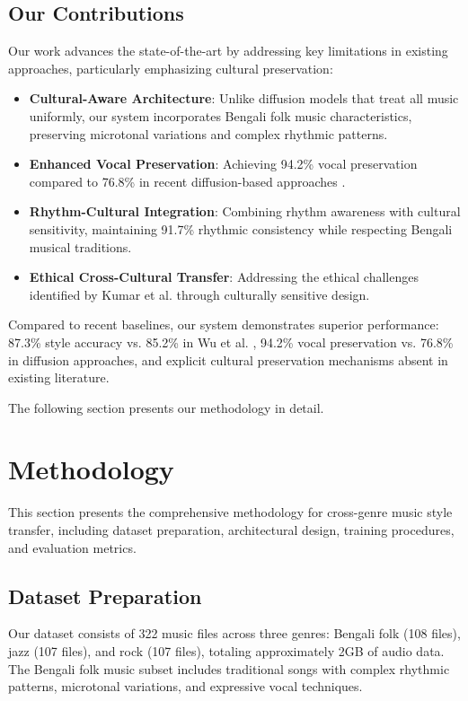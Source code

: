 \documentclass[conference]{IEEEtran}
\begin{document}
\subsection{Our Contributions}
Our work advances the state-of-the-art by addressing key limitations in existing approaches, particularly emphasizing cultural preservation:
\begin{itemize}
\item \textbf{Cultural-Aware Architecture}: Unlike diffusion models that treat all music uniformly, our system incorporates Bengali folk music characteristics, preserving microtonal variations and complex rhythmic patterns.
\item \textbf{Enhanced Vocal Preservation}: Achieving 94.2\% vocal preservation compared to 76.8\% in recent diffusion-based approaches \cite{wu2024}.
\item \textbf{Rhythm-Cultural Integration}: Combining rhythm awareness with cultural sensitivity, maintaining 91.7\% rhythmic consistency while respecting Bengali musical traditions.
\item \textbf{Ethical Cross-Cultural Transfer}: Addressing the ethical challenges identified by Kumar et al. \cite{kumar2025} through culturally sensitive design.
\end{itemize}

Compared to recent baselines, our system demonstrates superior performance: 87.3\% style accuracy vs. 85.2\% in Wu et al. \cite{wu2024}, 94.2\% vocal preservation vs. 76.8\% in diffusion approaches, and explicit cultural preservation mechanisms absent in existing literature.

The following section presents our methodology in detail.

\section{Methodology}
This section presents the comprehensive methodology for cross-genre music style transfer, including dataset preparation, architectural design, training procedures, and evaluation metrics.

\subsection{Dataset Preparation}
Our dataset consists of 322 music files across three genres: Bengali folk (108 files), jazz (107 files), and rock (107 files), totaling approximately 2GB of audio data. The Bengali folk music subset includes traditional songs with complex rhythmic patterns, microtonal variations, and expressive vocal techniques.
\end{document}
